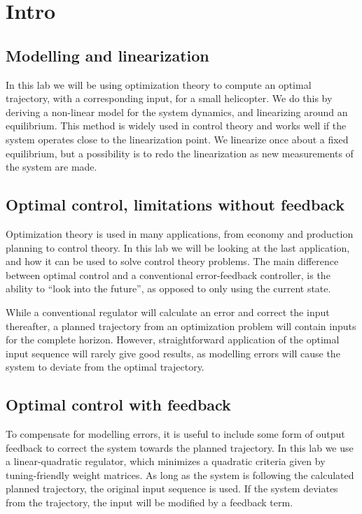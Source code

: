 \section{Intro}
\subsection{Modelling and linearization}
In this lab we will be using optimization theory to compute an optimal trajectory, with a corresponding input, for a small helicopter. We do this by deriving a non-linear model for
the system dynamics, and linearizing around an equilibrium. This method is widely used in
control theory and works well if the system operates close to the linearization point. We linearize once about a fixed equilibrium, but a possibility is to redo the linearization as new measurements of the system are made.

\subsection{Optimal control, limitations without feedback}
Optimization theory is used in many applications, from economy and production planning to control theory. In this lab we will be looking at the last application, and how it can be used to solve control theory problems. The main difference between optimal control and a conventional error-feedback controller, is the ability to ``look into the future'', as opposed to only using the current state.

While a conventional regulator will calculate an error and correct the input thereafter, a planned trajectory from an optimization problem will contain inputs for the complete horizon. However, straightforward application of the optimal input sequence will rarely give good results, as modelling errors will cause the system to deviate from the optimal trajectory.

\subsection{Optimal control with feedback}
To compensate for modelling errors, it is useful to include some form of output feedback to correct
the system towards the planned trajectory. In this lab we use a linear-quadratic regulator, which minimizes a quadratic criteria given by tuning-friendly weight matrices. As long as the system is following the calculated planned trajectory, the original input sequence is used. If the system deviates from the trajectory, the input will be modified by a feedback term.

